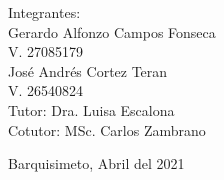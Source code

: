 \begin{titlepage}
\begin{table}[t]
\begin{flushright}
Integrantes:\\


Gerardo Alfonzo Campos Fonseca\\ 
V. 27085179\\
José Andrés Cortez Teran\\
V. 26540824\\

\vspace*{2mm}
Tutor: Dra. Luisa Escalona\\
Cotutor: MSc. Carlos Zambrano\\

\end{flushright}
\vspace*{5mm}

\begin{center}Barquisimeto, Abril del 2021\end{center}
\end{table}
\end{titlepage}

